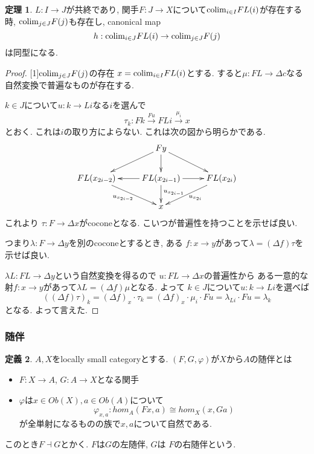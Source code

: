 \documentclass[dvipdfmx,a4paper,11pt]{article}
\newcommand{\colim}{{\rm colim}}
\theoremstyle{definition}
\newtheorem{thm}{定理}
\newtheorem{dfn}[thm]{定義}
\begin{document}
 \begin{tcolorbox}
 [colback = white, colframe = green!35!black, fonttitle = \bfseries,breakable = true]
\begin{thm}
\label{thm-cofinal-commute}
$L : I \to J$が共終であり, 関手$F : J \to X$について$\colim_{i\in I}FL(i)$が存在する時, 
$\colim_{j \in J} F(j)$も存在し, canonical map
$$
h : \colim_{i \in J}FL(i) \to \colim_{j \in J} F(j)
$$
は同型になる. 
\end{thm}
\end{tcolorbox}

\begin{proof}

[1]$\colim_{j \in J} F(j)$の存在
$x= \colim_{i\in I}FL(i)$とする.
すると$\mu : FL \to \Delta c$なる自然変換で普遍なものが存在する.

$k \in J$について$u : k \to Li$なる$i$を選んで
$$
\tau_k : Fk \overset{Fu}{\to} FLi \overset{\mu_{i}}{\to} x
$$
とおく. 
これは$i$の取り方によらない.
これは次の図から明らかである.
\begin{equation*}
\xymatrix@C=25pt@R=20pt{
& Fy\ar@{->}[ld]\ar@{->}[d]\ar@{->}[rd]
&
\\
FL(x_{2i-2})\ar@{->}[rd]_{u_{x_{2i-2}}}
&FL(x_{2i-1})\ar@{->}[l]\ar@{->}[r]\ar@{->}[d]^{u_{x_{2i-1}}}
&FL(x_{2i}) \ar@{->}[ld]^{u_{x_{2i}}}\\   
&x
& \\   
}
\end{equation*}
これより
$\tau : F \to \Delta x$がcoconeとなる.
こいつが普遍性を持つことを示せば良い.

つまり$\lambda : F \to \Delta y$を別のcoconeとするとき, ある
$f : x \to y$があって$\lambda = (\Delta f) \tau$を示せば良い.

$\lambda L : FL \to \Delta y$という自然変換を得るので
$u : FL \to \Delta x$の普遍性から
ある一意的な射$f : x \to y$があって$\lambda L = (\Delta f) \mu $となる.
よって
$k \in J$について$u : k \to Li$を選べば
$$
((\Delta f)\tau)_{k}
= 
(\Delta f)_{x}\cdot \tau_k
=
(\Delta f)_{x} \cdot \mu_{i} \cdot Fu
=\lambda_{Li}\cdot Fu
=\lambda _{k} 
$$
となる. 
よって言えた. 
\end{proof}


\subsubsection{随伴}
 \begin{tcolorbox}
 [colback = white, colframe = green!35!black, fonttitle = \bfseries,breakable = true]
\begin{dfn}
$A,X$をlocally small categoryとする.
$(F,G,\varphi)$が$X$から$A$の随伴とは
\begin{itemize}
\item $F :X \to A$, $G : A \to X$となる関手
\item $\varphi$は$x \in Ob(X), a \in Ob(A)$について
$$
\varphi_{x,a} : hom_{A}(Fx, a) \cong hom_{X}(x, Ga)
$$
が全単射になるものの族で$x,a$について自然である. 
\end{itemize}
このとき$F\dashv G$とかく.
$F$は$G$の左随伴, $G$は $F$の右随伴という. 
\end{dfn}
\end{tcolorbox}
\end{document}

